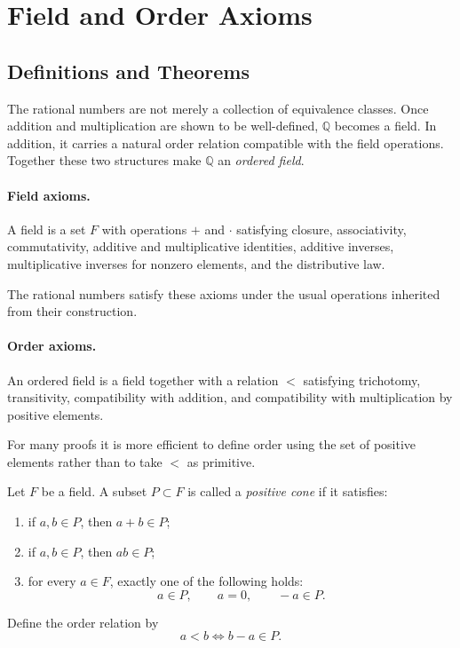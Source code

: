 
\section{Field and Order Axioms}
\label{sec:field-order-axioms}

\subsection{Definitions and Theorems}

The rational numbers are not merely a collection of equivalence classes.  Once addition and
multiplication are shown to be well-defined, $\mathbb{Q}$ becomes a field.  In addition, it carries a
natural order relation compatible with the field operations.  Together these two structures make
$\mathbb{Q}$ an \emph{ordered field}.

\paragraph{Field axioms.}
A field is a set $F$ with operations $+$ and $\cdot$ satisfying closure, associativity,
commutativity, additive and multiplicative identities, additive inverses, multiplicative inverses for
nonzero elements, and the distributive law.

\begin{remark}
The rational numbers satisfy these axioms under the usual operations inherited from their
construction.
\end{remark}

\paragraph{Order axioms.}
An ordered field is a field together with a relation $<$ satisfying trichotomy, transitivity,
compatibility with addition, and compatibility with multiplication by positive elements.

\begin{remark}
For many proofs it is more efficient to define order using the set of positive elements rather than to
take $<$ as primitive.
\end{remark}

\begin{definition}
\label{def:positive-cone}
Let $F$ be a field.  A subset $P\subset F$ is called a \emph{positive cone} if it satisfies:
\begin{enumerate}
  \item if $a,b\in P$, then $a+b\in P$;
  \item if $a,b\in P$, then $ab\in P$;
  \item for every $a\in F$, exactly one of the following holds:
  \[
  a\in P,
  \qquad
  a=0,
  \qquad
  -a\in P.
  \]
\end{enumerate}
Define the order relation by
\[
a<b \iff b-a\in P.
\]
\end{definition}

